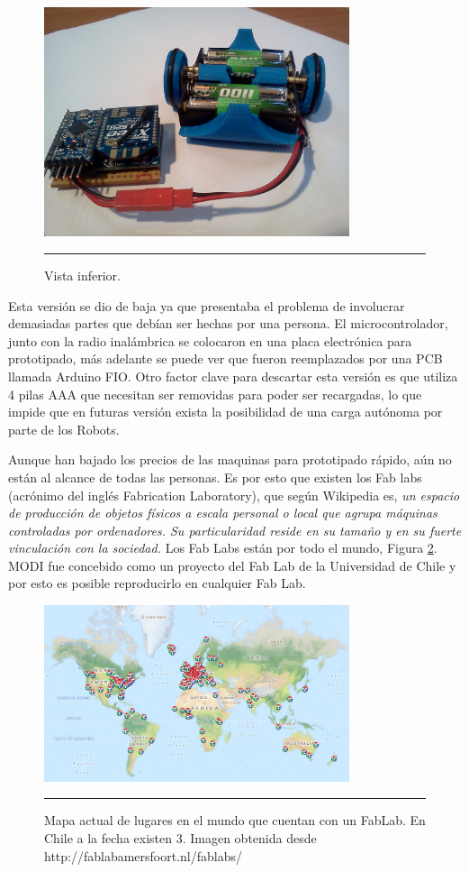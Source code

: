 \begin{figure}[htbp]
	\centering
		\includegraphics[width=0.8\textwidth]{./Pictures/3MODIrev2.jpg}
		\rule{35em}{0.5pt}
	\caption[modirev1]{Vista inferior.}
	\label{fig:3modirev2}
\end{figure}

Esta versión se dio de baja ya que presentaba el problema de involucrar demasiadas partes que debían ser hechas por una persona. El microcontrolador, junto con la radio inalámbrica se colocaron en una placa electrónica para prototipado, más adelante se puede ver que fueron reemplazados por una PCB llamada Arduino FIO. Otro factor clave para descartar esta versión es que utiliza 4 pilas AAA que necesitan ser removidas para poder ser recargadas, lo que impide que en futuras versión exista la posibilidad de una carga autónoma por parte de los Robots.

Aunque han bajado los precios de las maquinas para prototipado rápido, aún no están al alcance de todas las personas. Es por esto que existen los Fab labs (acrónimo del inglés Fabrication Laboratory), que según Wikipedia es, \textit{un espacio de producción de objetos físicos a escala personal o local que agrupa máquinas controladas por ordenadores. Su particularidad reside en su tamaño y en su fuerte vinculación con la sociedad.} Los Fab Labs están por todo el mundo, Figura \ref{fig:Fablabs}. MODI fue concebido como un proyecto del Fab Lab de la Universidad de Chile y por esto es posible reproducirlo en cualquier Fab Lab.

\begin{figure}[htbp]
	\centering
		\includegraphics[width=0.8\textwidth]{./Figures/map.png}
		\rule{35em}{0.5pt}
	\caption[modirev1]{Mapa actual de lugares en el mundo que cuentan con un FabLab. En Chile a la fecha existen 3. Imagen obtenida desde http://fablabamersfoort.nl/fablabs/}
	\label{fig:Fablabs}
\end{figure}	

